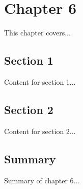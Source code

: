 \chapter{Chapter 6}

This chapter covers...

\section{Section 1}

Content for section 1...

\section{Section 2}

Content for section 2...

\section{Summary}

Summary of chapter 6...

